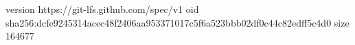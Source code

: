 version https://git-lfs.github.com/spec/v1
oid sha256:dcfe9245314acec48f2406aa953371017c5f6a523bbb02df0c44c82edff5c4d0
size 164677
